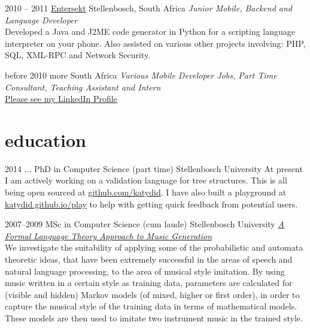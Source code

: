 \documentclass[]{friggeri-cv-a4} %
\begin{document}
\begin{entrylist}
\entry
{2010 -- 2011}
{\href{https://www.entersekt.com/}{Entersekt}}
{Stellenbosch, South Africa}
{\emph{Junior Mobile, Backend and Language Developer} \\
Developed a Java and J2ME code generator in Python for a scripting language interpreter on your phone.
Also assisted on various other projects involving: PHP, SQL, XML-RPC and Network Security.}

\entry
{before 2010}
{more}
{South Africa}
{\emph{Various Mobile Developer Jobs, Part Time Consultant, Teaching Assistant and Intern} \\
\href{https://za.linkedin.com/in/schulzewalter}{Please see my LinkedIn Profile}
}

\end{entrylist}

\newpage

\section{education}

\begin{entrylist}

\entry
{2014 ...}
{PhD {\normalfont in Computer Science} (part time)}
{Stellenbosch University}
{At present I am actively working on a validation language for tree structures.
This is all being open sourced at \href{https://github.com/katydid}{github.com/katydid}.
I have also built a playground at \href{https://katydid.github.io/play}{katydid.github.io/play} to help with getting quick feedback from potential users.}

\entry
{2007--2009}
{MSc {\normalfont in Computer Science} (cum laude)}
{Stellenbosch University}
{\href{http://superwillow.sourceforge.net/}{\emph{A Formal Language Theory Approach to Music Generation}} \\ We investigate the suitability of applying some of the probabilistic and automata theoretic ideas, that have been extremely successful in the areas of speech and natural language processing, to the area of musical style imitation. By using music written in a certain style as training data, parameters are calculated for (visible and hidden) Markov models (of mixed, higher or first order), in order to capture the musical style of the training data in terms of mathematical models. These models are then used to imitate two instrument music in the trained style.}

\end{entrylist}
\end{document}
